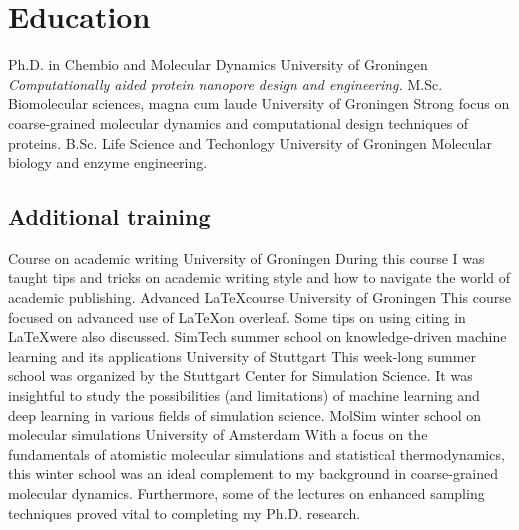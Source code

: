 \documentclass[letterpaper]{twentysecondcv} %
\begin{document}
\section{Education}

\begin{twenty} %
		{Ph.D. {\normalfont in Chembio and Molecular Dynamics}}
		{University of Groningen}
		{\emph{Computationally aided protein nanopore design and engineering.}}
		{M.Sc. Biomolecular sciences, magna cum laude}
		{University of Groningen}
		{Strong focus on coarse-grained molecular dynamics and computational design techniques of proteins.}
		{B.Sc. Life Science and Techonlogy}
		{University of Groningen}
		{Molecular biology and enzyme engineering.}
\end{twenty}




\subsection{Additional training}

\begin{twenty}
		{Course on academic writing}
		{University of Groningen}
		{During this course I was taught tips and tricks on academic writing style and how to navigate the world of academic publishing.}
		{Advanced \LaTeX course}
		{University of Groningen}
		{This course focused on advanced use of \LaTeX on overleaf. Some tips on using citing in \LaTeX were also discussed.}
		{SimTech summer school on knowledge-driven machine learning and its applications}
		{University of Stuttgart}
		{This week-long summer school was organized by the Stuttgart Center for Simulation Science. It was insightful to study the possibilities (and limitations) of machine learning and deep learning in various fields of simulation science.}
		{MolSim winter school on molecular simulations}
		{University of Amsterdam}
		{With a focus on the fundamentals of atomistic molecular simulations and statistical thermodynamics, this winter  school was an ideal complement to my background in coarse-grained molecular dynamics. Furthermore, some of the lectures on enhanced sampling techniques proved vital to completing my Ph.D. research.}
\end{twenty}
\end{document}

